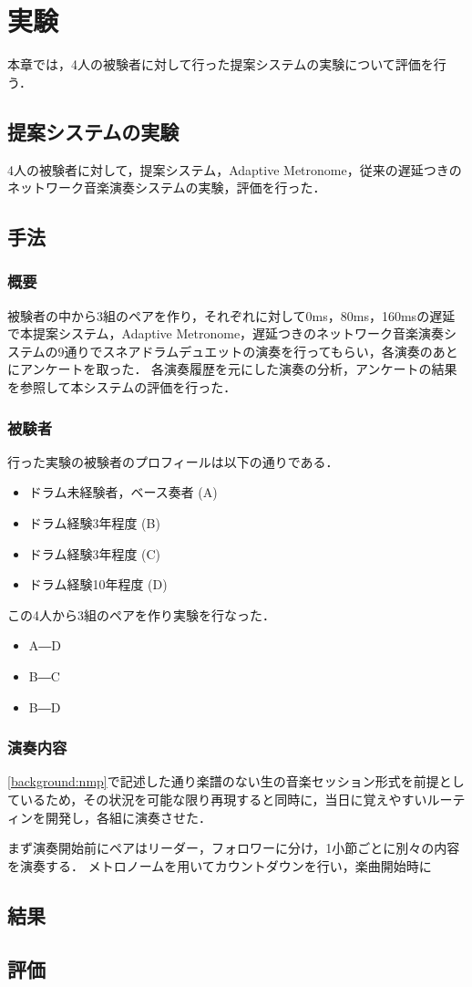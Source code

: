 \chapter{実験}
\label{evaluation}
本章では，4人の被験者に対して行った提案システムの実験について評価を行う．

\section{提案システムの実験}
4人の被験者に対して，提案システム，Adaptive Metronome，従来の遅延つきのネットワーク音楽演奏システムの実験，評価を行った．

\section{手法}
\subsection{概要}
被験者の中から3組のペアを作り，それぞれに対して0ms，80ms，160msの遅延で本提案システム，Adaptive Metronome，遅延つきのネットワーク音楽演奏システムの9通りでスネアドラムデュエットの演奏を行ってもらい，各演奏のあとにアンケートを取った．
各演奏履歴を元にした演奏の分析，アンケートの結果を参照して本システムの評価を行った．

\subsection{被験者}
行った実験の被験者のプロフィールは以下の通りである．
\begin{itemize}
  \item ドラム未経験者，ベース奏者 (A)
  \item ドラム経験3年程度 (B)
  \item ドラム経験3年程度 (C)
  \item ドラム経験10年程度 (D)
\end{itemize}

この4人から3組のペアを作り実験を行なった．

\begin{itemize}
  \item A―D
  \item B―C
  \item B―D
\end{itemize}

\subsection{演奏内容}
\ref{background:nmp}で記述した通り楽譜のない生の音楽セッション形式を前提としているため，その状況を可能な限り再現すると同時に，当日に覚えやすいルーティンを開発し，各組に演奏させた．

まず演奏開始前にペアはリーダー，フォロワーに分け，1小節ごとに別々の内容を演奏する．
メトロノームを用いてカウントダウンを行い，楽曲開始時に

\section{結果}
\section{評価}


